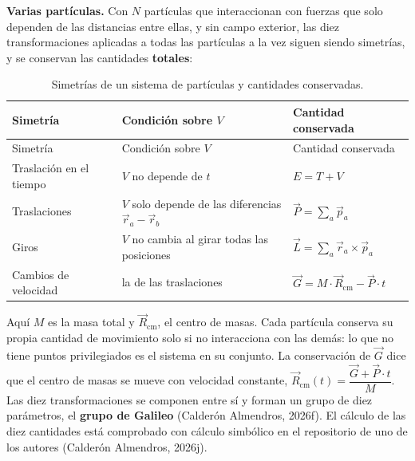\documentclass[11pt,a4paper,spanish]{book}
\begin{document}
\textbf{Varias partículas.} Con \(N\) partículas que interaccionan con
fuerzas que solo dependen de las distancias entre ellas, y sin campo
exterior, las diez transformaciones aplicadas a todas las partículas a
la vez siguen siendo simetrías, y se conservan las cantidades
\textbf{totales}:

\begin{longtable}[]{@{}
  >{\raggedright\arraybackslash}p{}
  >{\raggedright\arraybackslash}p{}
  >{\raggedright\arraybackslash}p{}@{}}
\caption{Simetrías de un sistema de partículas y cantidades
conservadas.}\tabularnewline
\toprule\noalign{}
\begin{minipage}[b]{\linewidth}\raggedright
Simetría
\end{minipage} & \begin{minipage}[b]{\linewidth}\raggedright
Condición sobre \(V\)
\end{minipage} & \begin{minipage}[b]{\linewidth}\raggedright
Cantidad conservada
\end{minipage} \\
\midrule\noalign{}
\endfirsthead
\toprule\noalign{}
\begin{minipage}[b]{\linewidth}\raggedright
Simetría
\end{minipage} & \begin{minipage}[b]{\linewidth}\raggedright
Condición sobre \(V\)
\end{minipage} & \begin{minipage}[b]{\linewidth}\raggedright
Cantidad conservada
\end{minipage} \\
\midrule\noalign{}
\endhead
\bottomrule\noalign{}
\endlastfoot
Traslación en el tiempo & \(V\) no depende de \(t\) & \(E = T + V\) \\
Traslaciones & \(V\) solo depende de las diferencias
\(\vec{r}_a - \vec{r}_b\) & \(\vec{P} = \sum_a \vec{p}_a\) \\
Giros & \(V\) no cambia al girar todas las posiciones &
\(\vec{L} = \sum_a \vec{r}_a \times \vec{p}_a\) \\
Cambios de velocidad & la de las traslaciones &
\(\vec{G} = M \cdot \vec{R}_{\mathrm{cm}} - \vec{P} \cdot t\) \\
\end{longtable}

Aquí \(M\) es la masa total y \(\vec{R}_{\mathrm{cm}}\), el centro de
masas. Cada partícula conserva su propia cantidad de movimiento solo si
no interacciona con las demás: lo que no tiene puntos privilegiados es
el sistema en su conjunto. La conservación de \(\vec{G}\) dice que el
centro de masas se mueve con velocidad constante,
\(\vec{R}_{\mathrm{cm}}(t) = \dfrac{\vec{G} + \vec{P} \cdot t}{M}\). Las
diez transformaciones se componen entre sí y forman un grupo de diez
parámetros, el \textbf{grupo de Galileo} (Calderón Almendros, 2026f). El
cálculo de las diez cantidades está comprobado con cálculo simbólico en
el repositorio de uno de los autores (Calderón Almendros, 2026j).
\end{document}
